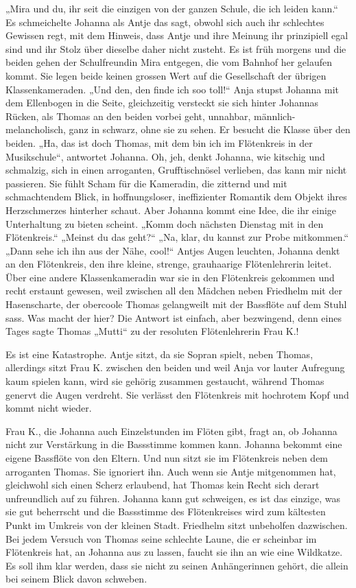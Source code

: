 \documentclass[10pt,titlepage,a5paper]{book}
\begin{document}
„Mira und du, ihr seit die einzigen von der ganzen Schule, die ich leiden kann.“ Es schmeichelte Johanna als Antje das sagt, obwohl sich auch ihr schlechtes Gewissen regt, mit dem Hinweis, dass Antje und ihre Meinung ihr prinzipiell egal sind und ihr Stolz über dieselbe daher  nicht zusteht. Es ist früh morgens und die beiden gehen der Schulfreundin Mira entgegen, die vom Bahnhof her gelaufen kommt. Sie legen beide keinen grossen Wert auf die Gesellschaft der übrigen Klassenkameraden. „Und den, den finde ich soo toll!“ Anja stupst Johanna mit dem Ellenbogen in die Seite, gleichzeitig versteckt sie sich hinter Johannas Rücken, als Thomas an den beiden vorbei geht, unnahbar, männlich-melancholisch, ganz in schwarz, ohne sie zu sehen. Er besucht die Klasse über den beiden. „Ha, das ist doch Thomas, mit dem bin ich im Flötenkreis in der Musikschule“, antwortet Johanna. Oh, jeh, denkt Johanna, wie kitschig und schmalzig, sich in einen arroganten, Grufftischnösel verlieben, das kann mir nicht passieren. Sie fühlt Scham für die Kameradin, die zitternd und mit schmachtendem Blick, in hoffnungsloser, ineffizienter Romantik dem Objekt ihres Herzschmerzes hinterher schaut. Aber Johanna kommt eine Idee, die ihr einige Unterhaltung zu bieten scheint. „Komm doch nächsten Dienstag mit in den Flötenkreis.“ „Meinst du das geht?“ „Na, klar, du kannst zur Probe mitkommen.“ „Dann sehe ich ihn aus der Nähe, cool!“ Antjes Augen leuchten, Johanna denkt an den Flötenkreis, den ihre kleine, strenge, grauhaarige Flötenlehrerin leitet. Über eine andere Klassenkameradin war sie in den Flötenkreis gekommen und recht erstaunt gewesen, weil zwischen all den Mädchen neben Friedhelm mit der Hasenscharte, der obercoole Thomas gelangweilt mit der Bassflöte auf dem Stuhl sass. Was macht der hier? Die Antwort  ist einfach, aber bezwingend, denn eines Tages sagte Thomas „Mutti“ zu der resoluten Flötenlehrerin Frau K.!

Es ist eine Katastrophe. Antje sitzt, da sie Sopran spielt, neben Thomas, allerdings sitzt Frau K. zwischen den beiden und weil Anja vor lauter Aufregung kaum spielen kann, wird sie gehörig zusammen gestaucht, während Thomas genervt die Augen verdreht. Sie verlässt den Flötenkreis mit hochrotem Kopf und kommt nicht wieder. 

Frau K., die Johanna auch Einzelstunden im Flöten gibt, fragt an, ob Johanna nicht zur Verstärkung in die Bassstimme kommen kann. Johanna bekommt eine eigene Bassflöte von den Eltern. Und nun sitzt sie im Flötenkreis neben dem arroganten Thomas. Sie ignoriert ihn. Auch wenn sie Antje mitgenommen hat, gleichwohl sich einen Scherz erlaubend, hat Thomas kein Recht sich derart unfreundlich auf zu führen. Johanna kann gut schweigen, es ist das einzige, was sie gut beherrscht und die Bassstimme des Flötenkreises  wird zum kältesten Punkt im Umkreis von der kleinen Stadt. Friedhelm sitzt unbeholfen dazwischen. Bei jedem Versuch von Thomas seine schlechte Laune, die er scheinbar im Flötenkreis hat, an Johanna aus zu lassen, faucht sie ihn an wie eine Wildkatze. Es soll ihm klar werden, dass sie nicht zu seinen Anhängerinnen gehört, die allein bei seinem Blick davon schweben. 
\end{document}
